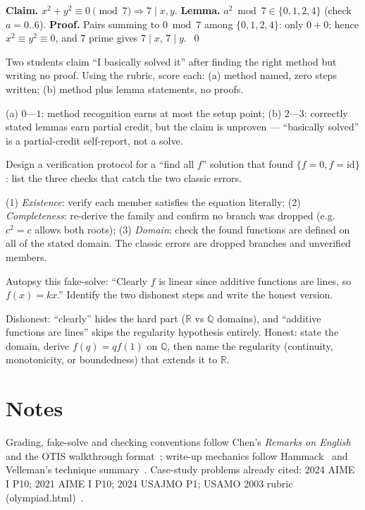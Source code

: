 \begin{solution}
\textbf{Claim.} $x^2+y^2\equiv0\pmod7 \Rightarrow 7\mid x,y$.
\textbf{Lemma.} $a^2\bmod7\in\{0,1,2,4\}$ (check $a=0..6$).
\textbf{Proof.} Pairs summing to $0\bmod7$ among
$\{0,1,2,4\}$: only $0+0$; hence $x^2\equiv y^2\equiv0$, and $7$
prime gives $7\mid x$, $7\mid y$.\ \qed
\end{solution}
\begin{exercise}[medium]\label{exr:ea13}
Two students claim ``I basically solved it'' after finding the right
method but writing no proof. Using the rubric, score each: (a) method
named, zero steps written; (b) method plus lemma statements, no
proofs.
\end{exercise}
\begin{solution}
(a) $0$---$1$: method recognition earns at most the setup point;
(b) $2$---$3$: correctly stated lemmas earn partial credit, but the
claim is unproven --- ``basically solved'' is a partial-credit
self-report, not a solve.
\end{solution}
\begin{exercise}[hard]\label{exr:ea14}
Design a verification protocol for a ``find all $f$'' solution that
found $\{f=0, f=\mathrm{id}\}$: list the three checks that catch the
two classic errors.
\end{exercise}
\begin{solution}
(1) \emph{Existence}: verify each member satisfies the equation
literally; (2) \emph{Completeness}: re-derive the family and confirm
no branch was dropped (e.g.\ $c^2=c$ allows both roots);
(3) \emph{Domain}: check the found functions are defined on all of
the stated domain. The classic errors are dropped branches and
unverified members.
\end{solution}
\begin{exercise}[hard]\label{exr:ea15}
Autopsy this fake-solve: ``Clearly $f$ is linear since additive
functions are lines, so $f(x)=kx$.'' Identify the two dishonest steps
and write the honest version.
\end{exercise}
\begin{solution}
Dishonest: ``clearly'' hides the hard part ($\mathbb R$ vs
$\mathbb Q$ domains), and ``additive functions are lines'' skips the
regularity hypothesis entirely. Honest: state the domain, derive
$f(q)=qf(1)$ on $\mathbb Q$, then name the regularity (continuity,
monotonicity, or boundedness) that extends it to $\mathbb R$.
\end{solution}

\section*{Notes}
Grading, fake-solve and checking conventions follow Chen's
\emph{Remarks on English}~\cite{chen-english} and the OTIS walkthrough
format~\cite{otis}; write-up mechanics follow Hammack~\cite{hammack}
and Velleman's technique summary~\cite{velleman}. Case-study problems
already cited: 2024 AIME I P10; 2021 AIME I P10; 2024 USAJMO P1;
USAMO 2003 rubric (olympiad.html)~\cite{chen-english}.

